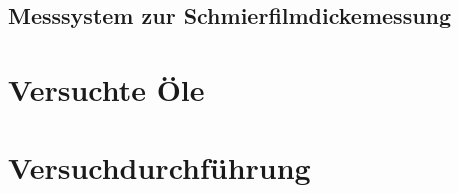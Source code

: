 \subsection{Messsystem zur Schmierfilmdickemessung}
\label{sub:messsystem_zur_schmierfilmdickemessung}

\section{Versuchte Öle}
\label{sec:versuchte_oele}

\section{Versuchdurchführung}
\label{sec:versuchdurchfuehrung}

